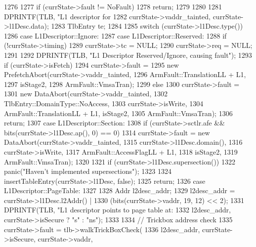 \begin{DoxyCode}
1276 {
1277     if (currState->fault != NoFault) {
1278         return;
1279     }
1280 
1281     DPRINTF(TLB, "L1 descriptor for %
1282             currState->vaddr_tainted, currState->l1Desc.data);
1283     TlbEntry te;
1284 
1285     switch (currState->l1Desc.type()) {
1286       case L1Descriptor::Ignore:
1287       case L1Descriptor::Reserved:
1288         if (!currState->timing) {
1289             currState->tc = NULL;
1290             currState->req = NULL;
1291         }
1292         DPRINTF(TLB, "L1 Descriptor Reserved/Ignore, causing fault\n");
1293         if (currState->isFetch)
1294             currState->fault =
1295                 new PrefetchAbort(currState->vaddr_tainted,
1296                                   ArmFault::TranslationLL + L1,
1297                                   isStage2,
1298                                   ArmFault::VmsaTran);
1299         else
1300             currState->fault =
1301                 new DataAbort(currState->vaddr_tainted,
1302                               TlbEntry::DomainType::NoAccess,
1303                               currState->isWrite,
1304                               ArmFault::TranslationLL + L1, isStage2,
1305                               ArmFault::VmsaTran);
1306         return;
1307       case L1Descriptor::Section:
1308         if (currState->sctlr.afe && bits(currState->l1Desc.ap(), 0) == 0) {
1314             currState->fault = new DataAbort(currState->vaddr_tainted,
1315                                              currState->l1Desc.domain(),
1316                                              currState->isWrite,
1317                                              ArmFault::AccessFlagLL + L1,
1318                                              isStage2,
1319                                              ArmFault::VmsaTran);
1320         }
1321         if (currState->l1Desc.supersection()) {
1322             panic("Haven't implemented supersections\n");
1323         }
1324         insertTableEntry(currState->l1Desc, false);
1325         return;
1326       case L1Descriptor::PageTable:
1327         {
1328             Addr l2desc_addr;
1329             l2desc_addr = currState->l1Desc.l2Addr() |
1330                 (bits(currState->vaddr, 19, 12) << 2);
1331             DPRINTF(TLB, "L1 descriptor points to page table at: %
1332                     l2desc_addr, currState->isSecure ? "s" : "ns");
1333 
1334             // Trickbox address check
1335             currState->fault = tlb->walkTrickBoxCheck(
1336                 l2desc_addr, currState->isSecure, currState->vaddr,
}}}
\end{DoxyCode}

